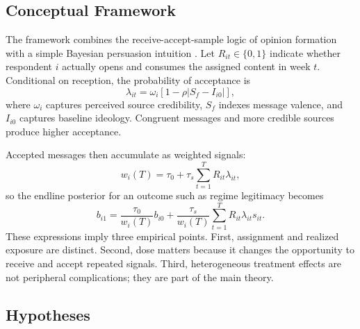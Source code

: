 \documentclass[12pt,american]{article}
\begin{document}
\subsection{Conceptual Framework}

The framework combines the receive-accept-sample logic of opinion formation \citep{zaller1992} with a simple Bayesian persuasion intuition \citep{kamenica2011bayesian}. Let \(R_{it}\in\{0,1\}\) indicate whether respondent \(i\) actually opens and consumes the assigned content in week \(t\). Conditional on reception, the probability of acceptance is
\[
\lambda_{it}
=
\omega_i \left[1-\rho\lvert S_f-I_{i0}\rvert\right],
\]
where \(\omega_i\) captures perceived source credibility, \(S_f\) indexes message valence, and \(I_{i0}\) captures baseline ideology. Congruent messages and more credible sources produce higher acceptance.

Accepted messages then accumulate as weighted signals:
\[
w_i(T)=\tau_0+\tau_s\sum_{t=1}^{T}R_{it}\lambda_{it},
\]
so the endline posterior for an outcome such as regime legitimacy becomes
\[
b_{i1}
=
\frac{\tau_0}{w_i(T)}b_{i0}
+
\frac{\tau_s}{w_i(T)}\sum_{t=1}^{T}R_{it}\lambda_{it}s_{it}.
\]
These expressions imply three empirical points. First, assignment and realized exposure are distinct. Second, dose matters because it changes the opportunity to receive and accept repeated signals. Third, heterogeneous treatment effects are not peripheral complications; they are part of the main theory.

\subsection{Hypotheses}
\end{document}
